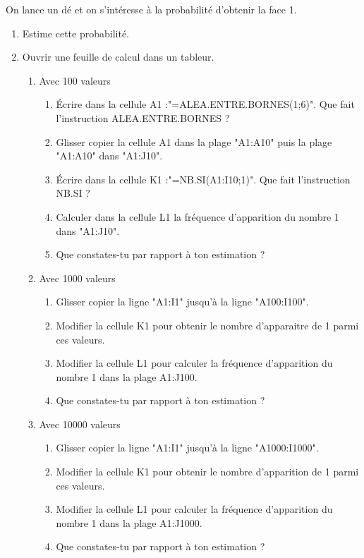 
On lance un dé et on s'intéresse à la probabilité d'obtenir la face 1.
\begin{enumerate}
\item Estime cette probabilité.
\item Ouvrir une feuille de calcul dans un tableur.
\begin{enumerate}
\item Avec 100 valeurs
\begin{enumerate}
\item Écrire dans la cellule A1 :"=ALEA.ENTRE.BORNES(1;6)". Que fait l'instruction ALEA.ENTRE.BORNES ?
\item Glisser copier la cellule A1 dans la plage "A1:A10" puis la plage "A1:A10" dans "A1:J10".
\item Écrire dans la cellule K1 :"=NB.SI(A1:I10;1)". Que fait l'instruction NB.SI ?
\item Calculer dans la cellule L1 la fréquence d'apparition du nombre 1 dans "A1:J10".
\item Que constates-tu par rapport à ton estimation ?
\end{enumerate}
\item Avec 1000 valeurs
\begin{enumerate}
\item Glisser copier la ligne "A1:I1" jusqu'à la ligne "A100:I100".
\item Modifier la cellule K1 pour obtenir le nombre d'apparaitre de 1 parmi ces  valeurs.
\item Modifier la cellule L1 pour calculer la fréquence d'apparition du nombre 1 dans la plage A1:J100.
\item Que constates-tu par rapport à ton estimation ?
\end{enumerate}
\item Avec 10000 valeurs
\begin{enumerate}
\item Glisser copier la ligne "A1:I1" jusqu'à la ligne "A1000:I1000".
\item Modifier la cellule K1 pour obtenir le nombre d'apparition de 1 parmi ces  valeurs.
\item Modifier la cellule L1 pour calculer la fréquence d'apparition du nombre 1 dans la plage A1:J1000.
\item Que constates-tu par rapport à ton estimation ?
\end{enumerate}
\end{enumerate}
\end{enumerate}
